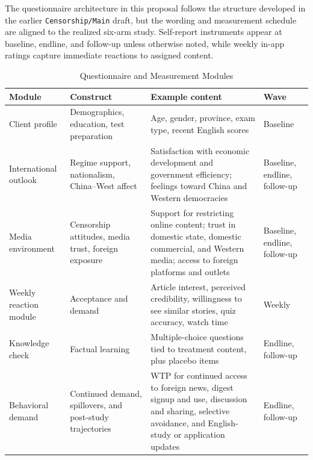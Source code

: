 \documentclass[12pt,american]{article}
\begin{document}
The questionnaire architecture in this proposal follows the structure developed in the earlier \texttt{Censorship/Main} draft, but the wording and measurement schedule are aligned to the realized six-arm study. Self-report instruments appear at baseline, endline, and follow-up unless otherwise noted, while weekly in-app ratings capture immediate reactions to assigned content.

\begin{table}[H]
\centering
\caption{Questionnaire and Measurement Modules}
\label{tab:questionnaire}
\footnotesize
\begin{tabularx}{\textwidth}{@{}L{0.20\textwidth}L{0.18\textwidth}L{0.39\textwidth}L{0.17\textwidth}@{}}
\toprule
Module & Construct & Example content & Wave \\
\midrule
Client profile & Demographics, education, test preparation & Age, gender, province, exam type, recent English scores & Baseline \\
International outlook & Regime support, nationalism, China--West affect & Satisfaction with economic development and government efficiency; feelings toward China and Western democracies & Baseline, endline, follow-up \\
Media environment & Censorship attitudes, media trust, foreign exposure & Support for restricting online content; trust in domestic state, domestic commercial, and Western media; access to foreign platforms and outlets & Baseline, endline, follow-up \\
Weekly reaction module & Acceptance and demand & Article interest, perceived credibility, willingness to see similar stories, quiz accuracy, watch time & Weekly \\
Knowledge check & Factual learning & Multiple-choice questions tied to treatment content, plus placebo items & Endline, follow-up \\
Behavioral demand & Continued demand, spillovers, and post-study trajectories & WTP for continued access to foreign news, digest signup and use, discussion and sharing, selective avoidance, and English-study or application updates & Endline, follow-up \\
\bottomrule
\end{tabularx}
\end{table}
\end{document}
